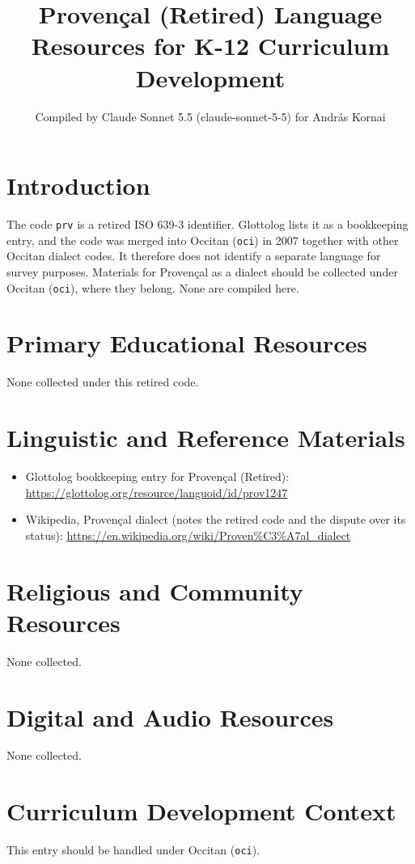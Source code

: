 \documentclass[12pt]{article}
\title{Proven\c{c}al (Retired) Language Resources for K-12 Curriculum Development}
\author{Compiled by Claude Sonnet 5.5 (claude-sonnet-5-5) for Andr\'as Kornai}
\date{}
\begin{document}
\maketitle

\section{Introduction}
The code \texttt{prv} is a retired ISO 639-3 identifier. Glottolog lists it as a bookkeeping entry, and the code was merged into Occitan (\texttt{oci}) in 2007 together with other Occitan dialect codes. It therefore does not identify a separate language for survey purposes. Materials for Proven\c{c}al as a dialect should be collected under Occitan (\texttt{oci}), where they belong. None are compiled here.

\section{Primary Educational Resources}
None collected under this retired code.

\section{Linguistic and Reference Materials}
\begin{itemize}
\item Glottolog bookkeeping entry for Proven\c{c}al (Retired): \url{https://glottolog.org/resource/languoid/id/prov1247}
\item Wikipedia, Proven\c{c}al dialect (notes the retired code and the dispute over its status): \url{https://en.wikipedia.org/wiki/Proven%C3%A7al_dialect}
\end{itemize}

\section{Religious and Community Resources}
None collected.

\section{Digital and Audio Resources}
None collected.

\section{Curriculum Development Context}
This entry should be handled under Occitan (\texttt{oci}).
\end{document}
